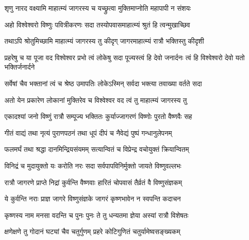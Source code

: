 \hyperref[sec:ekadashi_mahatmyam_padma_puranam]{\closesub}
\clearpage

\label{sec:padma-jagaranamahima}

\ganapatyadiDhyanam
\padmaPuranam



\twolineshloka
{शृणु नारद वक्ष्यामि माहात्म्यं जागरस्य च}
{यच्छ्रुत्वा मुक्तिमाप्नोति महापापी न संशयः}%


\twolineshloka
{अहो विश्वेश्वरो विष्णुः पवित्रीकरणः सदा}
{तस्योपवासमाहात्म्यं श्रुतं हि त्वन्मुखाच्छिव}%

\twolineshloka
{तथाऽपि श्रोतुमिच्छामि माहात्म्यं जागरस्य तु }
{कीदृग् जागरमाहात्म्यं रात्रौ भक्तिस्तु कीदृशी}%

\threelineshloka
{प्रहरेषु च या पूजा वद विश्वेश्वर प्रभो}
{त्वं लोकेषु सदा पूज्यस्त्वं हि देवो जनार्दनः}
{त्वं हि विश्वेश्वरो देवो यतो भक्तिर्जनार्दने}%

\twolineshloka
{सर्वेषां चैव भक्तानां त्वं च श्रेष्ठ उमापतिः}
{लोकेऽस्मिन् सर्वदा भक्त्या तवाख्या वर्तते सदा}%

\twolineshloka
{अतो येन प्रकारेण लोकानां मुक्तिरेव च}
{विश्वेश्वर वद त्वं तु माहात्म्यं जागरस्य तु}%


\twolineshloka
{एकादश्यां जनो विष्णुं रात्रौ सम्पूज्य भक्तितः}
{कुर्याज्जागरणं विष्णोः पुरतो वैष्णवैः सह}%

\twolineshloka
{गीतं वाद्यं तथा नृत्यं पुराणपठनं तथा}
{धूपं दीपं च नैवेद्यं पुष्पं गन्धानुलेपनम्}%

\twolineshloka
{फलमर्घं तथा श्रद्धा दानमिन्द्रियसंयमम्}
{सत्यान्वितं च विप्रेन्द्र वचोयुक्तं क्रियान्वितम्}%

\twolineshloka
{विनिद्रं च मुदायुक्तो यः करोति नरः सदा}
{सर्वपापविनिर्मुक्तो जायते विष्णुवल्लभः}%

\twolineshloka
{रात्रौ जागरणे प्राप्ते निद्रां कुर्वन्ति वैष्णवाः}
{हारितं चोपवासं तैर्व्रतं वै विष्णुसंज्ञकम्}%

\twolineshloka
{ये कुर्वन्ति नराः प्राज्ञ जागरे विष्णुसंज्ञके}
{जागरं कृष्णभावेन न स्वपन्ति कदाचन}%

\twolineshloka
{कृष्णस्य नाम मनसा वदन्ति च पुनः पुनः}
{ते तु धन्यतमा ज्ञेया अस्यां रात्रौ विशेषतः}%

\twolineshloka
{क्षणेक्षणे तु गोदानं घट्यां चैव चतुर्गुणम्}
{प्रहरे कोटिगुणितं चतुर्यामेष्वसङ्ख्यकम्}%

